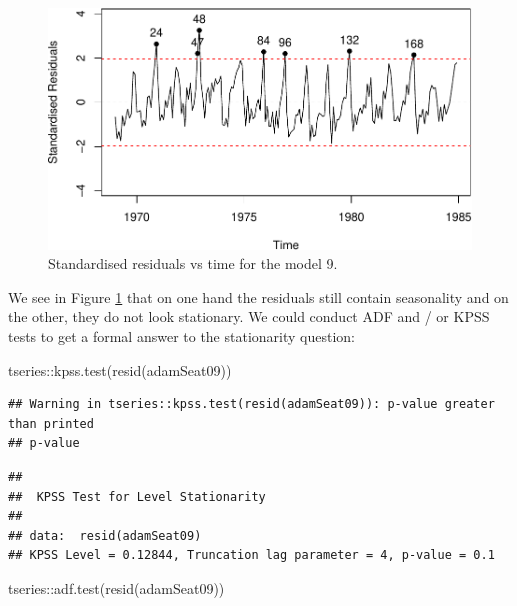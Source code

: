 \documentclass[
]{book}
\newenvironment{Shaded}{\begin{snugshade}}{\end{snugshade}}
\newcommand{\FunctionTok}[1]{\textcolor[rgb]{0.00,0.00,0.00}{#1}}
\newcommand{\NormalTok}[1]{#1}
\newcommand{\SpecialCharTok}[1]{\textcolor[rgb]{0.00,0.00,0.00}{#1}}
\theoremstyle{definition}
\theoremstyle{definition}
\theoremstyle{definition}
\theoremstyle{definition}
\theoremstyle{remark}
\begin{document}
\begin{figure}
\centering
\includegraphics{Svetunkov--2022----ADAM_files/figure-latex/adamSeat09ResidvsTime-1.pdf}
\caption{\label{fig:adamSeat09ResidvsTime}Standardised residuals vs time for the model 9.}
\end{figure}

We see in Figure \ref{fig:adamSeat09ResidvsTime} that on one hand the residuals still contain seasonality and on the other, they do not look stationary. We could conduct ADF and / or KPSS tests \citep[which will be discussed in one of the later Chapters of][]{SvetunkovSBA} to get a formal answer to the stationarity question:

\begin{Shaded}
\begin{Highlighting}[]
\NormalTok{tseries}\SpecialCharTok{::}\FunctionTok{kpss.test}\NormalTok{(}\FunctionTok{resid}\NormalTok{(adamSeat09))}
\end{Highlighting}
\end{Shaded}

\begin{verbatim}
## Warning in tseries::kpss.test(resid(adamSeat09)): p-value greater than printed
## p-value
\end{verbatim}

\begin{verbatim}
## 
##  KPSS Test for Level Stationarity
## 
## data:  resid(adamSeat09)
## KPSS Level = 0.12844, Truncation lag parameter = 4, p-value = 0.1
\end{verbatim}

\begin{Shaded}
\begin{Highlighting}[]
\NormalTok{tseries}\SpecialCharTok{::}\FunctionTok{adf.test}\NormalTok{(}\FunctionTok{resid}\NormalTok{(adamSeat09))}
\end{Highlighting}
\end{Shaded}
\end{document}
